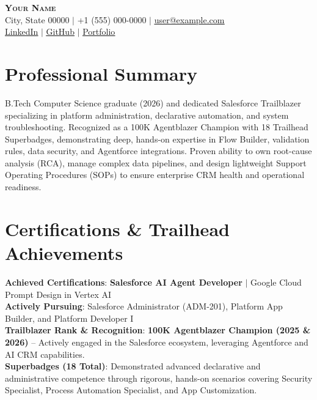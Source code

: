 \documentclass[letterpaper,9pt]{article}
\begin{document}
\begin{center}
    \textbf{\Large \scshape Your Name} \\ \vspace{2pt}
    City, State 00000 $|$ +1 (555) 000-0000 $|$ \href{mailto:user@example.com}{\underline{user@example.com}} \\ \vspace{2pt}
    \href{https://linkedin.com/in/yourprofile}{\underline{LinkedIn}} $|$
    \href{https://github.com/yourusername}{\underline{GitHub}} $|$
    \href{https://yourportfolio.com}{\underline{Portfolio}}
\end{center}

\vspace{-8pt}

\section{Professional Summary}
\vspace{1pt}
B.Tech Computer Science graduate (2026) and dedicated Salesforce Trailblazer specializing in platform administration, declarative automation, and system troubleshooting. Recognized as a 100K Agentblazer Champion with 18 Trailhead Superbadges, demonstrating deep, hands-on expertise in Flow Builder, validation rules, data security, and Agentforce integrations. Proven ability to own root-cause analysis (RCA), manage complex data pipelines, and design lightweight Support Operating Procedures (SOPs) to ensure enterprise CRM health and operational readiness.

\vspace{-4pt}

\section{Certifications \& Trailhead Achievements}
 \begin{itemize}[leftmargin=0.15in, label={}, itemsep=-1pt]
    \small{\item{
     \textbf{Achieved Certifications}{: \textbf{Salesforce AI Agent Developer} $|$ Google Cloud Prompt Design in Vertex AI} \\
     \textbf{Actively Pursuing}{: Salesforce Administrator (ADM-201), Platform App Builder, and Platform Developer I} \\
     \textbf{Trailblazer Rank \& Recognition}{: \textbf{100K Agentblazer Champion (2025 \& 2026)} -- Actively engaged in the Salesforce ecosystem, leveraging Agentforce and AI CRM capabilities.} \\
     \textbf{Superbadges (18 Total)}{: Demonstrated advanced declarative and administrative competence through rigorous, hands-on scenarios covering Security Specialist, Process Automation Specialist, and App Customization.}
    }}
 \end{itemize}
\end{document}

